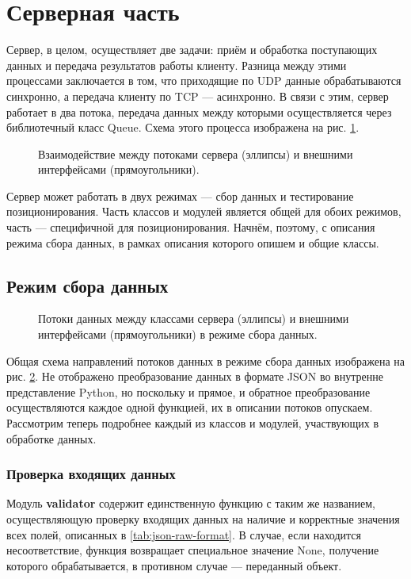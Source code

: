 \section{Серверная часть}
Сервер, в целом, осуществляет две задачи: приём и обработка поступающих данных и передача результатов работы клиенту. Разница между этими процессами заключается в том, что приходящие по UDP данные обрабатываются синхронно, а передача клиенту по TCP --- асинхронно. В связи с этим, сервер работает в два потока, передача данных между которыми осуществляется через библиотечный класс Queue. Схема этого процесса изображена на рис. \ref{fig:server-threads}.

\begin{figure}[h]
	\caption{Взаимодействие между потоками сервера (эллипсы) и внешними интерфейсами (прямоугольники).}
	\label{fig:server-threads}
\end{figure}

Сервер может работать в двух режимах --- сбор данных и тестирование позиционирования. Часть классов и модулей является общей для обоих режимов, часть --- специфичной для позиционирования. Начнём, поэтому, с описания режима сбора данных, в рамках описания которого опишем и общие классы.

\subsection{Режим сбора данных}
\begin{figure}[h]
	\caption{Потоки данных между классами сервера (эллипсы) и внешними интерфейсами (прямоугольники) в режиме сбора данных.}
	\label{fig:server-collect-dataflow}
\end{figure}
Общая схема направлений потоков данных в режиме сбора данных изображена на рис. \ref{fig:server-collect-dataflow}. Не отображено преобразование данных в формате JSON во внутренне представление Python, но поскольку и прямое, и обратное преобразование осуществляются каждое одной функцией, их в описании потоков опускаем. Рассмотрим теперь подробнее каждый из классов и модулей, участвующих в обработке данных.

\subsubsection{Проверка входящих данных}
Модуль {\bf validator} содержит единственную функцию с таким же названием, осуществляющую проверку входящих данных на наличие и корректные значения всех полей, описанных в \ref{tab:json-raw-format}. В случае, если находится несоответствие, функция возвращает специальное значение None, получение которого обрабатывается, в противном случае --- переданный объект.


